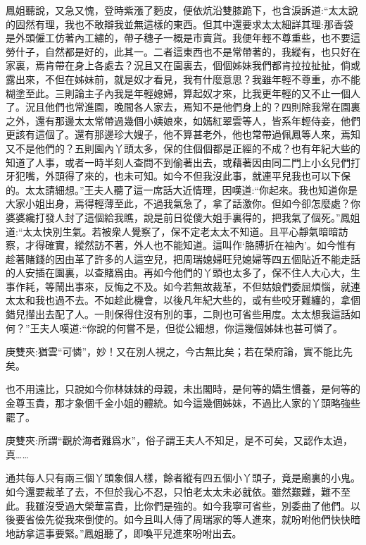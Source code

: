 \begin{parag}
    鳳姐聽說，又急又愧，登時紫漲了麪皮，便依炕沿雙膝跪下，也含淚訴道:“太太說的固然有理，我也不敢辯我並無這樣的東西。但其中還要求太太細詳其理:那香袋是外頭僱工仿著內工繡的，帶子穗子一概是市賣貨。我便年輕不尊重些，也不要這勞什子，自然都是好的，此其一。二者這東西也不是常帶著的，我縱有，也只好在家裏，焉肯帶在身上各處去？況且又在園裏去，個個姊妹我們都肯拉拉扯扯，倘或露出來，不但在姊妹前，就是奴才看見，我有什麼意思？我雖年輕不尊重，亦不能糊塗至此。三則論主子內我是年輕媳婦，算起奴才來，比我更年輕的又不止一個人了。況且他們也常進園，晚間各人家去，焉知不是他們身上的？四則除我常在園裏之外，還有那邊太太常帶過幾個小姨娘來，如嫣紅翠雲等人，皆系年輕侍妾，他們更該有這個了。還有那邊珍大嫂子，他不算甚老外，他也常帶過佩鳳等人來，焉知又不是他們的？五則園內丫頭太多，保的住個個都是正經的不成？也有年紀大些的知道了人事，或者一時半刻人查問不到偷著出去，或藉著因由同二門上小幺兒們打牙犯嘴，外頭得了來的，也未可知。如今不但我沒此事，就連平兒我也可以下保的。太太請細想。”王夫人聽了這一席話大近情理，因嘆道:“你起來。我也知道你是大家小姐出身，焉得輕薄至此，不過我氣急了，拿了話激你。但如今卻怎麼處？你婆婆纔打發人封了這個給我瞧，說是前日從傻大姐手裏得的，把我氣了個死。”鳳姐道:“太太快別生氣。若被衆人覺察了，保不定老太太不知道。且平心靜氣暗暗訪察，才得確實，縱然訪不著，外人也不能知道。這叫作‘胳膊折在袖內’。如今惟有趁著賭錢的因由革了許多的人這空兒，把周瑞媳婦旺兒媳婦等四五個貼近不能走話的人安插在園裏，以查賭爲由。再如今他們的丫頭也太多了，保不住人大心大，生事作耗，等鬧出事來，反悔之不及。如今若無故裁革，不但姑娘們委屈煩惱，就連太太和我也過不去。不如趁此機會，以後凡年紀大些的，或有些咬牙難纏的，拿個錯兒攆出去配了人。一則保得住沒有別的事，二則也可省些用度。太太想我這話如何？”王夫人嘆道:“你說的何嘗不是，但從公細想，你這幾個姊妹也甚可憐了。\begin{note}庚雙夾:猶雲“可憐”，妙！又在別人視之，今古無比矣；若在榮府論，實不能比先矣。\end{note}也不用遠比，只說如今你林妹妹的母親，未出閣時，是何等的嬌生慣養，是何等的金尊玉貴，那才象個千金小姐的體統。如今這幾個姊妹，不過比人家的丫頭略強些罷了。\begin{note}庚雙夾:所謂“觀於海者難爲水”，俗子謂王夫人不知足，是不可矣，又認作太過，真……\end{note}通共每人只有兩三個丫頭象個人樣，餘者縱有四五個小丫頭子，竟是廟裏的小鬼。如今還要裁革了去，不但於我心不忍，只怕老太太未必就依。雖然艱難，難不至此。我雖沒受過大榮華富貴，比你們是強的。如今我寧可省些，別委曲了他們。以後要省儉先從我來倒使的。如今且叫人傳了周瑞家的等人進來，就吩咐他們快快暗地訪拿這事要緊。”鳳姐聽了，即喚平兒進來吩咐出去。
\end{parag}


